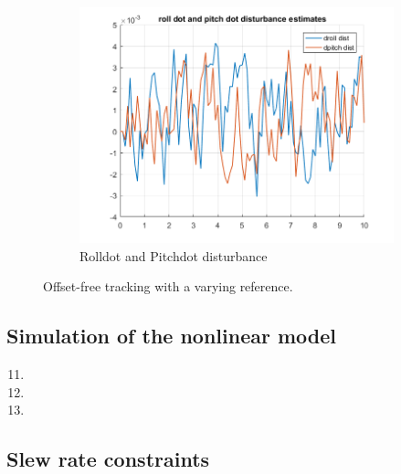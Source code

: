 \documentclass[11pt]{article}
\begin{document}
\begin{enumerate}
\begin{figure}[ht]
\begin{subfigure}[c]{0.3\linewidth}
            \includegraphics[width=\linewidth]{Plots_10_OffsetFreeTracking_Varying/10}
            \caption{Rolldot and Pitchdot disturbance}
        \end{subfigure}
        \caption{Offset-free tracking with a varying reference.}
        \label{fig:offset_free_tracking_with_varying}
    \end{figure}
    
\end{enumerate}



\subsection*{Simulation of the nonlinear model} %
\label{sub:simulation_of_the_nonlinear_model}

\begin{enumerate}
    \setcounter{enumi}{10}
    \item

    \item

    \item
\end{enumerate}



\subsection*{Slew rate constraints} %
\label{sub:slew_rate_constraints}
\end{document}
